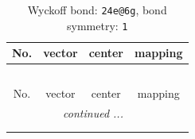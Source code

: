 \documentclass[fleqn,8pt]{jsarticle}
\begin{document}
\renewcommand{\arraystretch}{1.2}
\begin{longtable}{cccc}
\caption{Wyckoff bond: {\tt 24e@6g}, bond symmetry: {\tt 1}}
 \\
 \hline \hline
No. & vector & center & mapping \\ \hline \endfirsthead

\multicolumn{3}{l}{\tablename\ \thetable{}} \\
 \hline \hline
No. & vector & center & mapping \\ \hline \endhead

 \hline \hline
\multicolumn{3}{r}{\footnotesize\it continued ...} \\ \endfoot

 \hline \hline
\multicolumn{3}{r}{} \\ \endlastfoot


\end{longtable}
\end{document}
